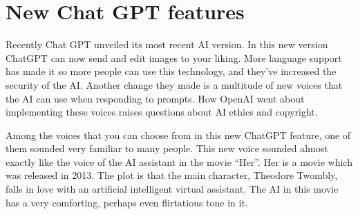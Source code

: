 \section{New Chat GPT features}
\label{sec:ai}






Recently Chat GPT unveiled its most recent AI version. In this new version ChatGPT can now send and edit images to your liking. More language support has made it so more people can use this technology, and they’ve increased the security of the AI. Another change they made is a multitude of new voices that the AI can use when responding to prompts. How OpenAI went about implementing these voices raises questions about AI ethics and copyright.

Among the voices that you can choose from in this new ChatGPT feature, one of them sounded very familiar to many people. This new voice sounded almost exactly like the voice of the AI assistant in the movie “Her”. Her is a movie which was released in 2013. The plot is that the main character, Theodore Twombly, falls in love with an artificial intelligent virtual assistant. The AI in this movie has a very comforting, perhaps even flirtatious tone in it. \citep{Her} 
